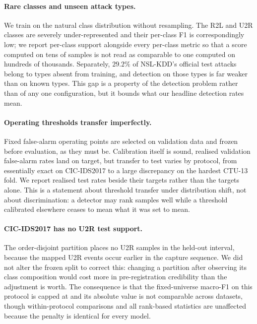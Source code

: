 \paragraph{Rare classes and unseen attack types.}
We train on the natural class distribution without resampling. The R2L and U2R
classes are severely under-represented and their per-class F1 is correspondingly
low; we report per-class support alongside every per-class metric so that a
score computed on tens of samples is not read as comparable to one computed on
hundreds of thousands. Separately, $29.2\%$ of NSL-KDD's official test attacks
belong to types absent from training, and detection on those types is far weaker
than on known types. This gap is a property of the detection problem rather than
of any one configuration, but it bounds what our headline detection rates mean.

\paragraph{Operating thresholds transfer imperfectly.}
Fixed false-alarm operating points are selected on validation data and frozen
before evaluation, as they must be. Calibration itself is sound, realised
validation false-alarm rates land on target, but transfer to test varies by
protocol, from essentially exact on CIC-IDS2017 to a large discrepancy on the
hardest CTU-13 fold. We report realised test rates beside their targets rather
than the targets alone. This is a statement about threshold transfer under
distribution shift, not about discrimination: a detector may rank samples well
while a threshold calibrated elsewhere ceases to mean what it was set to mean.

\paragraph{CIC-IDS2017 has no U2R test support.}
The order-disjoint partition places no U2R samples in the held-out interval,
because the mapped U2R events occur earlier in the capture sequence. We did not
alter the frozen split to correct this: changing a partition after observing its
class composition would cost more in pre-registration credibility than the
adjustment is worth. The consequence is that the fixed-universe macro-F1 on this
protocol is capped at \FNCicCeiling{} and its absolute value is not comparable
across datasets, though within-protocol comparisons and all rank-based
statistics are unaffected because the penalty is identical for every model.

